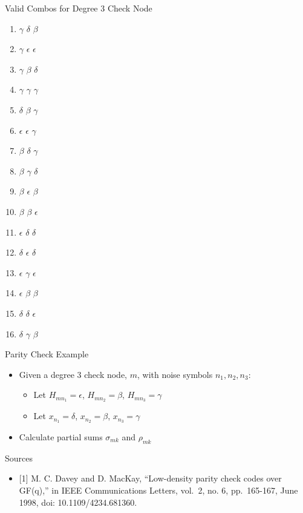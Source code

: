 \documentclass[10pt,ignorenonframetext,]{beamer}
\providecommand{\tightlist}{%
  \setlength{\itemsep}{0pt}\setlength{\parskip}{0pt}}
\begin{document}
\begin{frame}{Valid Combos for Degree 3 Check Node}
\protect\hypertarget{valid-combos-for-degree-3-check-node}{}
\begin{enumerate}[<+->]
\tightlist
\item
  \(\gamma\) \(\delta\) \(\beta\)
\item
  \(\gamma\) \(\epsilon\) \(\epsilon\)\\
\item
  \(\gamma\) \(\beta\) \(\delta\)\\
\item
  \(\gamma\) \(\gamma\) \(\gamma\)
\item
  \(\delta\) \(\beta\) \(\gamma\)
\item
  \(\epsilon\) \(\epsilon\) \(\gamma\)
\item
  \(\beta\) \(\delta\) \(\gamma\)
\item
  \(\beta\) \(\gamma\) \(\delta\)
\item
  \(\beta\) \(\epsilon\) \(\beta\)
\item
  \(\beta\) \(\beta\) \(\epsilon\)
\item
  \(\epsilon\) \(\delta\) \(\delta\)
\item
  \(\delta\) \(\epsilon\) \(\delta\)
\item
  \(\epsilon\) \(\gamma\) \(\epsilon\)
\item
  \(\epsilon\) \(\beta\) \(\beta\)\\
\item
  \(\delta\) \(\delta\) \(\epsilon\)
\item
  \(\delta\) \(\gamma\) \(\beta\)
\end{enumerate}
\end{frame}

\begin{frame}{Parity Check Example}
\protect\hypertarget{parity-check-example}{}
\begin{itemize}[<+->]
\tightlist
\item
  Given a degree 3 check node, \(m\), with noise symbols
  \(n_1, n_2, n_3\):

  \begin{itemize}[<+->]
  \tightlist
  \item
    Let \(H_{mn_1} = \epsilon\), \(H_{mn_2} = \beta\),
    \(H_{mn_3} = \gamma\)
  \item
    Let \(x_{n_1} = \delta\), \(x_{n_2} = \beta\), \(x_{n_3} = \gamma\)
  \end{itemize}
\item
  Calculate partial sums \(\sigma_{mk}\) and \(\rho_{mk}\)
\end{itemize}
\end{frame}

\begin{frame}{Sources}
\protect\hypertarget{sources}{}
\begin{itemize}[<+->]
\tightlist
\item
  {[}1{]} M. C. Davey and D. MacKay, ``Low-density parity check codes
  over GF(q),'' in IEEE Communications Letters, vol.~2, no. 6,
  pp.~165-167, June 1998, doi: 10.1109/4234.681360.
\end{itemize}
\end{frame}
\end{document}

